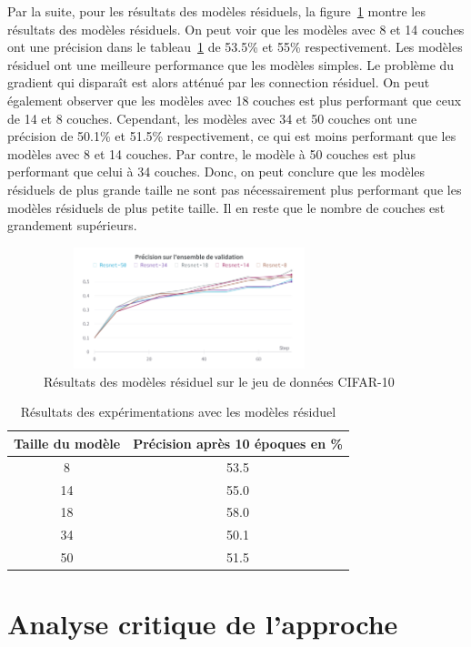 \documentclass{article}
\begin{document}
Par la suite, pour les résultats des modèles résiduels, la figure~\ref{fig:result_resnet} montre les résultats des modèles résiduels.
On peut voir que les modèles avec 8 et 14 couches ont une précision dans le tableau~\ref{tab:result_resnet} de 53.5\% et 55\% respectivement.
Les modèles résiduel ont une meilleure performance que les modèles simples. Le problème du gradient qui disparaît est alors atténué par les 
connection résiduel.
On peut également observer que les modèles avec 18 couches est plus performant que ceux de 14 et 8 couches.
Cependant, les modèles avec 34 et 50 couches ont une précision de 50.1\% et 51.5\% respectivement, ce qui est moins performant
que les modèles avec 8 et 14 couches. Par contre, le modèle à 50 couches est plus performant que celui à 34 couches. Donc, on peut
conclure que les modèles résiduels de plus grande taille
ne sont pas nécessairement plus performant que les modèles résiduels de plus petite taille.
Il en reste que le nombre de couches est grandement supérieurs.

\begin{figure}[h]
    \centering
    \includegraphics[width=240pt,height=100pt]{./img/result_resnet.png}
    \caption{Résultats des modèles résiduel sur le jeu de données CIFAR-10}\label{fig:result_resnet}
\end{figure}

\begin{table}[H]
    \centering
    \begin{tabular}{cc}
    \hline
    Taille du modèle & Précision après 10 époques en \% \\
    \hline
    8 & 53.5 \\
    14 & 55.0 \\
    18 & 58.0 \\
    34 & 50.1 \\
    50 & 51.5 \\
    \hline
    \end{tabular}
    \caption{Résultats des expérimentations avec les modèles résiduel}\label{tab:result_resnet}
\end{table}

\section{Analyse critique de l'approche}
\end{document}
